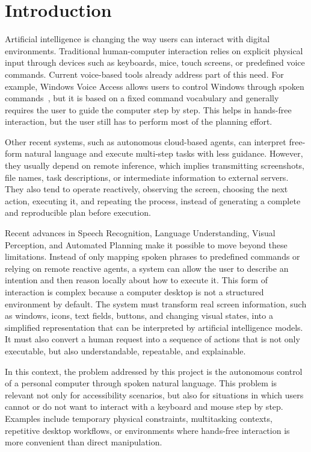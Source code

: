 \chapter{Introduction}
\setcounter{section}{0}

Artificial intelligence is changing the way users can interact with digital environments. Traditional human-computer interaction relies on explicit physical input through devices such as keyboards, mice, touch screens, or predefined voice commands. Current voice-based tools already address part of this need. For example, Windows Voice Access allows users to control Windows through spoken commands~\cite{windows_voice_access}, but it is based on a fixed command vocabulary and generally requires the user to guide the computer step by step. This helps in hands-free interaction, but the user still has to perform most of the planning effort.

Other recent systems, such as autonomous cloud-based agents, can interpret free-form natural language and execute multi-step tasks with less guidance. However, they usually depend on remote inference, which implies transmitting screenshots, file names, task descriptions, or intermediate information to external servers. They also tend to operate reactively, observing the screen, choosing the next action, executing it, and repeating the process, instead of generating a complete and reproducible plan before execution.

Recent advances in Speech Recognition, Language Understanding, Visual Perception, and Automated Planning make it possible to move beyond these limitations. Instead of only mapping spoken phrases to predefined commands or relying on remote reactive agents, a system can allow the user to describe an intention and then reason locally about how to execute it. This form of interaction is complex because a computer desktop is not a structured environment by default. The system must transform real screen information, such as windows, icons, text fields, buttons, and changing visual states, into a simplified representation that can be interpreted by artificial intelligence models. It must also convert a human request into a sequence of actions that is not only executable, but also understandable, repeatable, and explainable.

In this context, the problem addressed by this project is the autonomous control of a personal computer through spoken natural language. This problem is relevant not only for accessibility scenarios, but also for situations in which users cannot or do not want to interact with a keyboard and mouse step by step. Examples include temporary physical constraints, multitasking contexts, repetitive desktop workflows, or environments where hands-free interaction is more convenient than direct manipulation.

